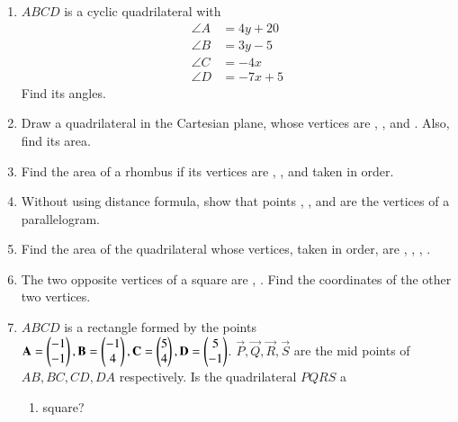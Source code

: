 \begin{enumerate}[label=\arabic*.,ref=\thesubsection.\theenumi]
\item $ABCD$ is a cyclic quadrilateral with 
\begin{align}
\angle A &= 4y+20
\\
\angle B &= 3y-5
\\
\angle C &= -4x
\\
\angle D &= -7x+5
\end{align}
%
Find its angles.
\item Draw a quadrilateral in the Cartesian plane, whose vertices are , ,  and . Also, find its area.
\item Find the area of a rhombus if its vertices are , ,  and  taken in order.
\item Without using distance formula, show that points , ,  and  are the vertices of a parallelogram.
\item  Find the area of the quadrilateral whose vertices, taken in order, are 
 ,  ,  ,  . 
\item The two opposite vertices of a square are ,  . Find the coordinates of the other two vertices.
\item $ABCD$ is a rectangle formed by the points $\mathbf{A} = \begin{pmatrix}-1\\-1\end{pmatrix}, \mathbf{B} = \begin{pmatrix}-1\\4\end{pmatrix}, \mathbf{C} = \begin{pmatrix}5\\4\end{pmatrix}, \mathbf{D} = \begin{pmatrix}5\\-1\end{pmatrix}$. $ \vec{P}, \vec{Q}, \vec{R}, \vec{S}$ are the mid points of $AB, BC, CD, DA$ respectively.  Is the quadrilateral $PQRS$ a 
\begin{enumerate}
\item square?

\end{enumerate}
\end{enumerate}

